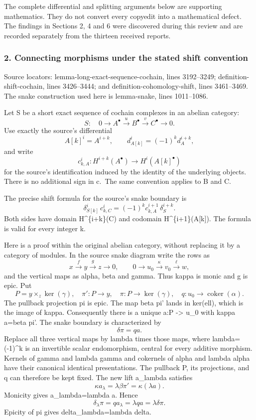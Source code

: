 \documentclass[11pt]{article}
\begin{document}
The complete differential and splitting arguments below are supporting mathematics. They do not convert every copyedit into a mathematical defect. The findings in Sections 2, 4 and 6 were discovered during this review and are recorded separately from the thirteen received reports.

\subsubsection{2. Connecting morphisms under the stated shift convention}\label{connecting-morphisms-under-the-stated-shift-convention}

Source locators: lemma-long-exact-sequence-cochain, lines 3192--3249; definition-shift-cochain, lines 3426--3444; and definition-cohomology-shift, lines 3461--3469. The snake construction used here is lemma-snake, lines 1011--1086.

Let S be a short exact sequence of cochain complexes in an abelian category: \[
S:\quad 0\longrightarrow A^\bullet\xrightarrow{u}B^\bullet
\xrightarrow{v}C^\bullet\longrightarrow0.
\] Use exactly the source's differential \[
A[k]^i=A^{i+k},\qquad d_{A[k]}^i=(-1)^k d_A^{i+k},
\] and write \[
c_{k,A}^i:H^{i+k}(A^\bullet)\longrightarrow H^i(A[k]^\bullet)
\] for the source's identification induced by the identity of the underlying objects. There is no additional sign in c.~The same convention applies to B and C.

The precise shift formula for the source's snake boundary is \[
\boxed{\quad
\delta_{S[k]}^i\,c_{k,C}^i
 =(-1)^k c_{k,A}^{i+1}\,\delta_S^{i+k}.
\quad}                                                    \tag{2.1}
\] Both sides have domain H\^{}\{i+k\}(C) and codomain H\^{}\{i+1\}(A{[}k{]}). The formula is valid for every integer k.

Here is a proof within the original abelian category, without replacing it by a category of modules. In the source snake diagram write the rows as \[
x\xrightarrow{f}y\xrightarrow{g}z\longrightarrow0,\qquad
0\longrightarrow u_0\xrightarrow{\kappa}v_0
\xrightarrow{\ell}w,
\] and the vertical maps as alpha, beta and gamma. Thus kappa is monic and g is epic. Put \[
P=y\times_z\ker(\gamma),\quad
\pi':P\longrightarrow y,\quad
\pi:P\longrightarrow\ker(\gamma),\quad
q:u_0\longrightarrow\operatorname{coker}(\alpha).
\] The pullback projection pi is epic. The map beta pi' lands in ker(ell), which is the image of kappa. Consequently there is a unique a:P -\textgreater{} u\_0 with kappa a=beta pi'. The snake boundary is characterized by \[
\delta\pi=qa.
\] Replace all three vertical maps by lambda times those maps, where lambda=(-1)\^{}k is an invertible scalar endomorphism, central for every additive morphism. Kernels of gamma and lambda gamma and cokernels of alpha and lambda alpha have their canonical identical presentations. The pullback P, its projections, and q can therefore be kept fixed. The new lift a\_lambda satisfies \[
\kappa a_\lambda=\lambda\beta\pi'
 =\kappa(\lambda a).
\] Monicity gives a\_lambda=lambda a. Hence \[
\delta_\lambda\pi=q a_\lambda
 =\lambda q a=\lambda\delta\pi.
\] Epicity of pi gives delta\_lambda=lambda delta.
\end{document}

